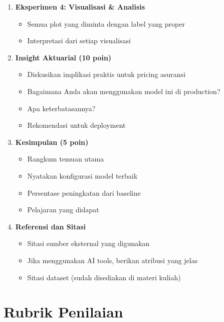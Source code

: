\documentclass[12pt,a4paper]{article}
\begin{document}
\begin{enumerate}[label=\textbf{\arabic*.}]
    \item \textbf{Eksperimen 4: Visualisasi \& Analisis}
    \begin{itemize}
        \item Semua plot yang diminta dengan label yang proper
        \item Interpretasi dari setiap visualisasi
    \end{itemize}
    
    \item \textbf{Insight Aktuarial (10 poin)}
    \begin{itemize}
        \item Diskusikan implikasi praktis untuk pricing asuransi
        \item Bagaimana Anda akan menggunakan model ini di production?
        \item Apa keterbatasannya?
        \item Rekomendasi untuk deployment
    \end{itemize}
    
    \item \textbf{Kesimpulan (5 poin)}
    \begin{itemize}
        \item Rangkum temuan utama
        \item Nyatakan konfigurasi model terbaik
        \item Persentase peningkatan dari baseline
        \item Pelajaran yang didapat
    \end{itemize}
    
    \item \textbf{Referensi dan Sitasi}
    \begin{itemize}
        \item Sitasi sumber eksternal yang digunakan
        \item Jika menggunakan AI tools, berikan atribusi yang jelas
        \item Sitasi dataset (sudah disediakan di materi kuliah)
    \end{itemize}
\end{enumerate}

\section{Rubrik Penilaian}
\end{document}
